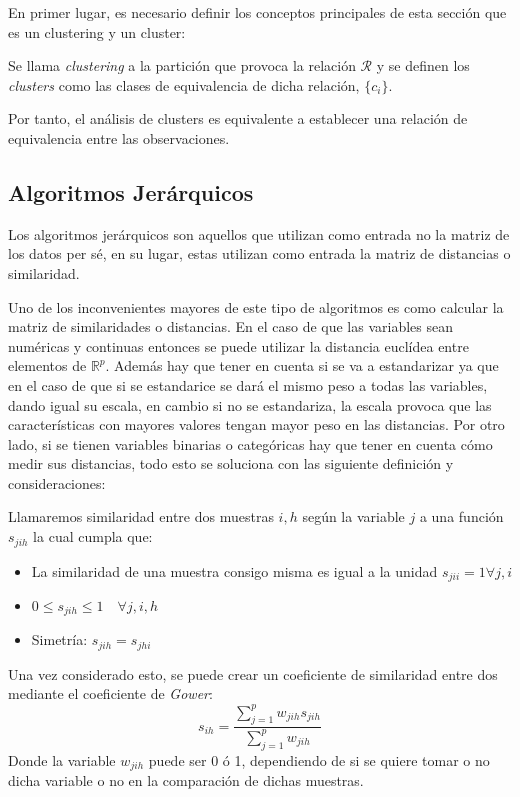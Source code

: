 \noindent En primer lugar, es necesario definir los conceptos principales de esta sección que es un clustering y un cluster:

\begin{defi}
Se llama \textit{clustering} a la partición que provoca la relación $\mathcal{R}$ y se definen los \textit{clusters} como las clases de equivalencia de dicha relación, $\lbrace c_i\rbrace$. 
\end{defi}

\noindent Por tanto, el análisis de clusters es equivalente a establecer una relación de equivalencia entre las observaciones.  

\subsection{Algoritmos Jerárquicos}
\noindent Los algoritmos jerárquicos son aquellos que utilizan como entrada no la matriz de los datos per sé, en su lugar, estas utilizan como entrada la matriz de distancias o similaridad.

\noindent Uno de los inconvenientes mayores de este tipo de algoritmos es como calcular la matriz de similaridades o distancias. En el caso de que las variables sean numéricas y continuas entonces se puede utilizar la distancia euclídea entre elementos de $\mathbb{R}^p$. Además hay que tener en cuenta si se va a estandarizar ya que en el caso de que si se estandarice se dará el mismo peso a todas las variables, dando igual su escala, en cambio si no se estandariza, la escala provoca que las características con mayores valores tengan mayor peso en las distancias. Por otro lado, si se tienen variables binarias o categóricas hay que tener en cuenta cómo medir sus distancias, todo esto se soluciona con las siguiente definición y consideraciones:

\begin{defi}
Llamaremos similaridad entre dos muestras $i,h$ según la variable $j$ a una función $s_{jih}$ la cual cumpla que:
\begin{itemize}
\item La similaridad de una muestra consigo misma es igual a la unidad $s_{jii}=1 \forall j,i$
\item $0\leq s_{jih} \leq 1\quad \forall j,i,h $
\item Simetría: $s_{jih}=s_{jhi}$
\end{itemize}
\end{defi}

\noindent Una vez considerado esto, se puede crear un coeficiente de similaridad entre dos mediante el coeficiente de \emph{Gower}:
\begin{equation}
s_{ih}=\dfrac{\sum_{j=1}^{p}w_{jih}s_{jih}}{\sum_{j=1}^{p}w_{jih}}
\end{equation}
\noindent Donde la variable $w_{jih}$ puede ser 0 ó 1, dependiendo de si se quiere tomar o no dicha variable o no en la comparación de dichas muestras. 

